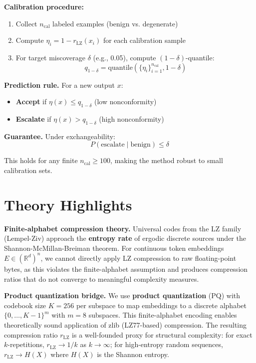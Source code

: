 \documentclass[11pt]{article}
\begin{document}
\textbf{Calibration procedure:}
\begin{enumerate}
\item Collect $n_{\text{cal}}$ labeled examples (benign vs. degenerate)
\item Compute $\eta_i = 1 - r_{\text{LZ}}(x_i)$ for each calibration sample
\item For target miscoverage $\delta$ (e.g., 0.05), compute $(1-\delta)$-quantile:
\begin{equation}
q_{1-\delta} = \text{quantile}(\{\eta_i\}_{i=1}^{n_{\text{cal}}}, 1-\delta)
\end{equation}
\end{enumerate}

\textbf{Prediction rule.} For a new output $x$:
\begin{itemize}
\item \textbf{Accept} if $\eta(x) \leq q_{1-\delta}$ (low nonconformity)
\item \textbf{Escalate} if $\eta(x) > q_{1-\delta}$ (high nonconformity)
\end{itemize}

\textbf{Guarantee.} Under exchangeability:
\begin{equation}
P(\text{escalate} \mid \text{benign}) \leq \delta
\end{equation}

This holds for any finite $n_{\text{cal}} \geq 100$, making the method robust to small calibration sets.

\section{Theory Highlights}
\label{sec:theory}

\textbf{Finite-alphabet compression theory.} Universal codes from the LZ family (Lempel-Ziv) approach the \textbf{entropy rate} of ergodic discrete sources under the Shannon-McMillan-Breiman theorem. For continuous token embeddings $E \in (\mathbb{R}^d)^n$, we cannot directly apply LZ compression to raw floating-point bytes, as this violates the finite-alphabet assumption and produces compression ratios that do not converge to meaningful complexity measures.

\textbf{Product quantization bridge.} We use \textbf{product quantization} (PQ) with codebook size $K=256$ per subspace to map embeddings to a discrete alphabet $\{0,\dots,K-1\}^m$ with $m=8$ subspaces. This finite-alphabet encoding enables theoretically sound application of zlib (LZ77-based) compression. The resulting compression ratio $r_{\text{LZ}}$ is a well-founded proxy for structural complexity: for exact $k$-repetitions, $r_{\text{LZ}} \rightarrow 1/k$ as $k \rightarrow \infty$; for high-entropy random sequences, $r_{\text{LZ}} \rightarrow H(X)$ where $H(X)$ is the Shannon entropy.
\end{document}
